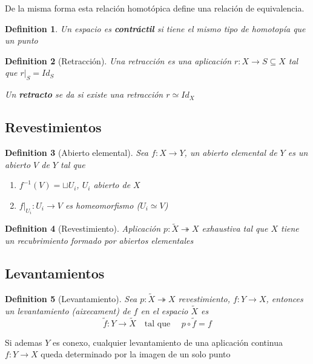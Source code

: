 \documentclass{myclass}
\newtheorem*{definition}{Definition}
\begin{document}
De la misma forma esta relación homotópica define una relación de equivalencia.

\begin{definition}
Un espacio es \textbf{contráctil} si tiene el mismo tipo de homotopía que un punto 
\end{definition}

\begin{definition}[Retracción]
  Una retracción es una aplicación $r:X \to S \subseteq X$ tal que $r|_S = Id_S$

  Un \textbf{retracto} se da si existe una retracción $r\simeq Id_X$
\end{definition}

\subsection{Revestimientos}
\begin{definition}[Abierto elemental] Sea $f:X \to  Y$, un abierto elemental de $Y$ es un abierto $V$ de  $Y$ tal que
  \begin{enumerate}[topsep=-6pt, itemsep=0pt]
    \item $f^{-1}(V) = \sqcup U_i$, $U_i$ abierto de  $X$
	\item  $f|_{U_i}: U_i \to V$ es homeomorfismo ($U_i \simeq V$)
  \end{enumerate}
\end{definition}



\begin{definition}[Revestimiento] Aplicación $p:\tilde{X} \twoheadrightarrow X$ exhaustiva tal que $X$ tiene un recubrimiento formado por abiertos elementales
\end{definition}

\subsection{Levantamientos}
\begin{definition}[Levantamiento] Sea $p: \tilde{X} \twoheadrightarrow  X$ revestimiento, $f: Y \to X$, entonces un levantamiento (aixecament) de $f$ en el espacio  $\tilde{X}$ es
  \[
  \tilde{f}: Y \to \tilde{X} \quad \text{tal que } \quad p\circ \tilde{f} = f
  \] 
\end{definition}

Si ademas $Y$ es conexo, cualquier levantamiento de una aplicación continua $f: Y \to X$ queda determinado por la imagen de un solo punto
\end{document}
